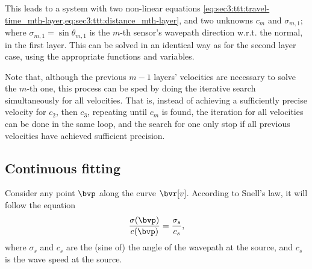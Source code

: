 This leads to a system with two non-linear equations \cref{eq:sec3:ttt:travel-time_mth-layer,eq:sec3:ttt:distance_mth-layer}, and two unknowns $c_m$ and $\sigma_{m,1}$; where $\sigma_{m,1} = \sin\theta_{m,1}$ is the $m$-th sensor's wavepath direction w.r.t. the normal, in the first layer. This can be solved in an identical way as for the second layer case, using the appropriate functions and variables.

Note that, although the previous $m-1$ layers' velocities are necessary to solve the $m$-th one, this process can be sped by doing the iterative search simultaneously for all velocities. That is, instead of achieving a sufficiently precise velocity for $c_2$, then $c_3$, repeating until $c_m$ is found, the iteration for all velocities can be done in the same loop, and the search for one only stop if all previous velocities have achieved sufficient precision.

%

%
%

\subsection{Continuous fitting}

Consider any point $\bvp$ along the curve $\bvr[v]$. According to Snell's law, it will follow the equation
\begin{equation}
	\frac{\sigma(\bvp)}{c(\bvp)} = \frac{\sigma_s}{c_s},
\end{equation}
where $\sigma_s$ and $c_s$ are the (sine of) the angle of the wavepath at the source, and $c_s$ is the wave speed at the source.

